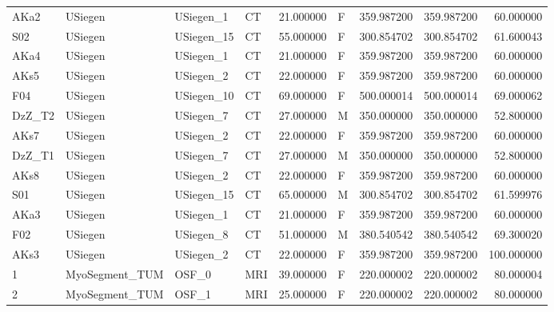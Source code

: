 \begin{tabular}{llllrlrrr}
AKa2   &         USiegen &    USiegen\_1 &                 CT &  21.000000 &        F &       359.987200 &    359.987200 &   60.000000 \\
S02    &         USiegen &   USiegen\_15 &                 CT &  55.000000 &        F &       300.854702 &    300.854702 &   61.600043 \\
AKa4   &         USiegen &    USiegen\_1 &                 CT &  21.000000 &        F &       359.987200 &    359.987200 &   60.000000 \\
AKs5   &         USiegen &    USiegen\_2 &                 CT &  22.000000 &        F &       359.987200 &    359.987200 &   60.000000 \\
F04    &         USiegen &   USiegen\_10 &                 CT &  69.000000 &        F &       500.000014 &    500.000014 &   69.000062 \\
DzZ\_T2 &         USiegen &    USiegen\_7 &                 CT &  27.000000 &        M &       350.000000 &    350.000000 &   52.800000 \\
AKs7   &         USiegen &    USiegen\_2 &                 CT &  22.000000 &        F &       359.987200 &    359.987200 &   60.000000 \\
DzZ\_T1 &         USiegen &    USiegen\_7 &                 CT &  27.000000 &        M &       350.000000 &    350.000000 &   52.800000 \\
AKs8   &         USiegen &    USiegen\_2 &                 CT &  22.000000 &        F &       359.987200 &    359.987200 &   60.000000 \\
S01    &         USiegen &   USiegen\_15 &                 CT &  65.000000 &        M &       300.854702 &    300.854702 &   61.599976 \\
AKa3   &         USiegen &    USiegen\_1 &                 CT &  21.000000 &        F &       359.987200 &    359.987200 &   60.000000 \\
F02    &         USiegen &    USiegen\_8 &                 CT &  51.000000 &        M &       380.540542 &    380.540542 &   69.300020 \\
AKs3   &         USiegen &    USiegen\_2 &                 CT &  22.000000 &        F &       359.987200 &    359.987200 &  100.000000 \\
1      &  MyoSegment\_TUM &        OSF\_0 &                MRI &  39.000000 &        F &       220.000002 &    220.000002 &   80.000004 \\
2      &  MyoSegment\_TUM &        OSF\_1 &                MRI &  25.000000 &        F &       220.000002 &    220.000002 &   80.000000 \\

\end{tabular}
